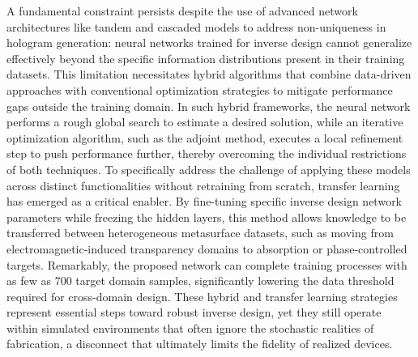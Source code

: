 \documentclass[11pt]{article}
\begin{document}
A fundamental constraint persists despite the use of advanced network architectures like tandem and cascaded models to address non-uniqueness in hologram generation: neural networks trained for inverse design cannot generalize effectively beyond the specific information distributions present in their training datasets. This limitation necessitates hybrid algorithms that combine data-driven approaches with conventional optimization strategies to mitigate performance gaps outside the training domain. In such hybrid frameworks, the neural network performs a rough global search to estimate a desired solution, while an iterative optimization algorithm, such as the adjoint method, executes a local refinement step to push performance further, thereby overcoming the individual restrictions of both techniques. To specifically address the challenge of applying these models across distinct functionalities without retraining from scratch, transfer learning has emerged as a critical enabler. By fine-tuning specific inverse design network parameters while freezing the hidden layers, this method allows knowledge to be transferred between heterogeneous metasurface datasets, such as moving from electromagnetic-induced transparency domains to absorption or phase-controlled targets. \citep{doi_10_1364_ol_514212_108a4a7f} \citep{doi_10_1109_ieeeconf35879_2020_9330480_27bef614} Remarkably, the proposed network can complete training processes with as few as 700 target domain samples, significantly lowering the data threshold required for cross-domain design. These hybrid and transfer learning strategies represent essential steps toward robust inverse design, yet they still operate within simulated environments that often ignore the stochastic realities of fabrication, a disconnect that ultimately limits the fidelity of realized devices. \citep{doi_10_1021_acsphotonics_2c00968_06a2e96b} \citep{doi_10_1364_ol_514212_108a4a7f}
\end{document}

